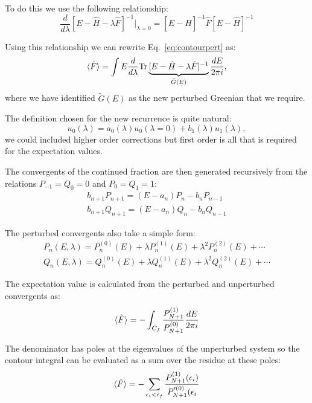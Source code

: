 To do this we use the following relationship:
%
\begin{equation}
\frac{d}{d\lambda} [E-\hat{H}-\lambda \hat{F}]^{-1} \Bigr|_{\lambda = 0} = [E-\hat{H}]^{-1}\hat{F}[E-\hat{H}]^{-1}
\end{equation}
%

Using this relationship we can rewrite Eq.~\ref{eq:contourpert} as:
%
\begin{equation}
        \langle \hat{F} \rangle = \int E \frac{d}{d\lambda} {\rm Tr}\underbrace{[E-\hat{H}-\lambda \hat{F}]^{-1}}_{\tilde{G}(E)} \frac{dE}{2\pi i},
\end{equation}
%
where we have identified $\tilde{G}(E)$ as the new perturbed Greenian that we require. 

The definition chosen for the new recurrence is quite natural:
%
\begin{equation}
        [\hat{H} + \lambda \hat{F}] u_{0}(\lambda) = a_{0}(\lambda)u_0(\lambda=0) + b_1(\lambda)u_{1}(\lambda),
\end{equation}
%
we could included higher order corrections but first order is all that is required for the expectation values.

The convergents of the continued fraction are then generated recursively from the relations
$P_{-1}=Q_{0}=0$ and $P_{0}=Q_{1}=1$:
\begin{align}
b_{n+1}P_{n+1} = (E-a_{n})P_{n} - b_{n}P_{n-1}\\
b_{n+1}Q_{n+1} = (E-a_{n})Q_{n} - b_{n}Q_{n-1}
\end{align}

The perturbed convergents also take a simple form:
%
\begin{align}
P_{n}(E,\lambda) = P^{(0)}_{n}(E) + \lambda P_{n}^{(1)}(E) + \lambda^{2}P_{n}^{(2)}(E) + \cdots \\
Q_{n}(E,\lambda) = Q^{(0)}_{n}(E) + \lambda Q_{n}^{(1)}(E) + \lambda^{2}Q_{n}^{(2)}(E) + \cdots 
\end{align}
%

The expectation value is calculated from the perturbed and unperturbed convergents as:
%
\begin{equation}
        \langle \hat{F} \rangle = - \int_{C_{f}} \frac{P_{N+1}^{(1)}}{P_{N+1}^{(0)}} \frac{dE}{2\pi i}
\end{equation}

The denominator has poles at the eigenvalues of the unperturbed system so the contour integral can be evaluated
as a sum over the residue at these poles:
%
\begin{equation}
        \langle \hat{F} \rangle = - \sum_{\epsilon_{i} < \epsilon_{f}} \frac{P^{(1)}_{N+1}(\epsilon_{i})}{P'^{(0)}_{N+1}(\epsilon_{i}}
\end{equation}

